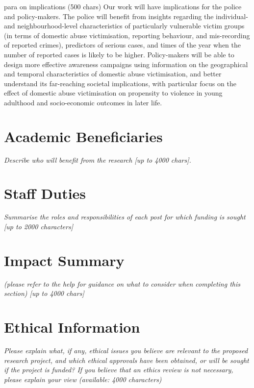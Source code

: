 \documentclass[11pt, a4paper]{article}
\begin{document}
 
para on implications (500 chars)
Our work will have implications for the police and policy-makers. The police will benefit from insights regarding the individual- and neighbourhood-level characteristics of particularly vulnerable victim groups (in terms of domestic abuse victimisation, reporting behaviour, and mis-recording of reported crimes), predictors of serious cases, and times of the year when the number of reported cases is likely to be higher. Policy-makers will be able to design more effective awareness campaigns using information on the geographical and temporal characteristics of domestic abuse victimisation, and better understand its far-reaching societal implications, with particular focus on the effect of domestic abuse victimisation on propensity to violence in young adulthood and  socio-economic outcomes in later life.  



\section{Academic Beneficiaries}

\textit{Describe who will benefit from the research [up to 4000 chars].}

\section{Staff Duties}

\textit{Summarise the roles and responsibilities of each post for which funding is sought [up to 2000 characters]}

\section{Impact Summary }

\textit{(please refer to the help for guidance on what to consider when completing this section) [up to 4000 chars]}

\section{Ethical Information}

\textit{Please explain what, if any, ethical issues you believe are relevant to the proposed research project, and which ethical approvals have been obtained, or will be sought if the project is funded? If you believe that an ethics review is not necessary, please explain your view (available: 4000 characters)}
\end{document}
